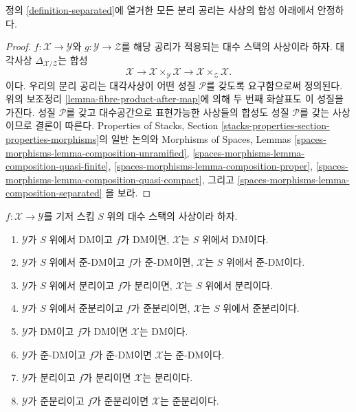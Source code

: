 \begin{lemma}
\label{lemma-composition-separated}
정의 \ref{definition-separated}에 열거한 모든 분리 공리는
사상의 합성 아래에서 안정하다.
\end{lemma}

\begin{proof}
$f : \mathcal{X} \to \mathcal{Y}$와
$g : \mathcal{Y} \to \mathcal{Z}$를 해당 공리가 적용되는
대수 스택의 사상이라 하자.
대각사상 $\Delta_{\mathcal{X}/\mathcal{Z}}$는 합성
$$
\mathcal{X} \longrightarrow
\mathcal{X} \times_\mathcal{Y} \mathcal{X} \longrightarrow
\mathcal{X} \times_\mathcal{Z} \mathcal{X}.
$$
이다. 우리의 분리 공리는 대각사상이 어떤 성질 $\mathcal{P}$를
갖도록 요구함으로써 정의된다. 위의 보조정리
\ref{lemma-fibre-product-after-map}에 의해 두 번째 화살표도 이 성질을
가진다. 성질 $\mathcal{P}$를 갖고 대수공간으로 표현가능한 사상들의
합성도 성질 $\mathcal{P}$를 갖는 사상이므로 결론이 따른다.
Properties of Stacks, Section
\ref{stacks-properties-section-properties-morphisms}의 일반 논의와
Morphisms of Spaces, Lemmas
\ref{spaces-morphisms-lemma-composition-unramified},
\ref{spaces-morphisms-lemma-composition-quasi-finite},
\ref{spaces-morphisms-lemma-composition-proper},
\ref{spaces-morphisms-lemma-composition-quasi-compact}, 그리고
\ref{spaces-morphisms-lemma-composition-separated}
을 보라.
\end{proof}

\begin{lemma}
\label{lemma-separated-over-separated}
$f : \mathcal{X} \to \mathcal{Y}$를 기저 스킴 $S$ 위의
대수 스택의 사상이라 하자.
\begin{enumerate}
\item $\mathcal{Y}$가 $S$ 위에서 DM이고 $f$가 DM이면,
$\mathcal{X}$는 $S$ 위에서 DM이다.
\item $\mathcal{Y}$가 $S$ 위에서 준-DM이고 $f$가 준-DM이면,
$\mathcal{X}$는 $S$ 위에서 준-DM이다.
\item $\mathcal{Y}$가 $S$ 위에서 분리이고 $f$가 분리이면,
$\mathcal{X}$는 $S$ 위에서 분리이다.
\item $\mathcal{Y}$가 $S$ 위에서 준분리이고 $f$가 준분리이면,
$\mathcal{X}$는 $S$ 위에서 준분리이다.
\item $\mathcal{Y}$가 DM이고 $f$가 DM이면 $\mathcal{X}$는 DM이다.
\item $\mathcal{Y}$가 준-DM이고 $f$가 준-DM이면
$\mathcal{X}$는 준-DM이다.
\item $\mathcal{Y}$가 분리이고 $f$가 분리이면
$\mathcal{X}$는 분리이다.
\item $\mathcal{Y}$가 준분리이고 $f$가 준분리이면
$\mathcal{X}$는 준분리이다.
\end{enumerate}
\end{lemma}

